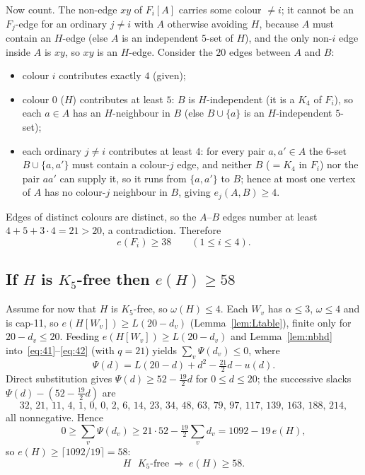 \documentclass[11pt,reqno]{amsart}
\theoremstyle{definition}
\theoremstyle{remark}
\newcommand{\capeleven}{\textsf{cap-11}}
\begin{document}
Now count. The non-edge $xy$ of $F_i[A]$ carries some colour $\ne i$; it cannot be
an $F_j$-edge for an ordinary $j\ne i$ with $A$ otherwise avoiding $H$, because $A$
must contain an $H$-edge (else $A$ is an independent $5$-set of $H$), and the only
non-$i$ edge inside $A$ is $xy$, so $xy$ is an $H$-edge. Consider the $20$ edges
between $A$ and $B$:
\begin{itemize}[nosep]
\item colour $i$ contributes exactly $4$ (given);
\item colour $0$ ($H$) contributes at least $5$: $B$ is $H$-independent (it is a
$K_4$ of $F_i$), so each $a\in A$ has an $H$-neighbour in $B$ (else $B\cup\{a\}$ is
an $H$-independent $5$-set);
\item each ordinary $j\ne i$ contributes at least $4$: for every pair $a,a'\in A$
the $6$-set $B\cup\{a,a'\}$ must contain a colour-$j$ edge, and neither $B$
($=K_4$ in $F_i$) nor the pair $aa'$ can supply it, so it runs from $\{a,a'\}$ to
$B$; hence at most one vertex of $A$ has no colour-$j$ neighbour in $B$, giving
$e_j(A,B)\ge 4$.
\end{itemize}
Edges of distinct colours are distinct, so the $A$--$B$ edges number at least
$4+5+3\cdot 4=21>20$, a contradiction. Therefore
\begin{equation}\label{eq:MH-38}
  e(F_i)\ge 38\qquad(1\le i\le 4).
\end{equation}

\subsection{If $H$ is $K_5$-free then $e(H)\ge 58$}\label{ssec:MH-58}
Assume for now that $H$ is $K_5$-free, so $\omega(H)\le 4$. Each $W_v$ has
$\alpha\le 3$, $\omega\le 4$ and is \capeleven, so $e(H[W_v])\ge L(20-d_v)$
(Lemma~\ref{lem:Ltable}), finite only for $20-d_v\le 20$. Feeding
$e(H[W_v])\ge L(20-d_v)$ and Lemma~\ref{lem:nbhd} into~\eqref{eq:41}--\eqref{eq:42}
(with $q=21$) yields $\sum_v\Psi(d_v)\le 0$, where
\[
  \Psi(d)=L(20-d)+d^2-\tfrac{21}{2}d-u(d).
\]
Direct substitution gives $\Psi(d)\ge 52-\tfrac{19}{2}d$ for $0\le d\le 20$; the
successive slacks $\Psi(d)-(52-\tfrac{19}{2}d)$ are
\[
  32,\,21,\,11,\,4,\,1,\,0,\,0,\,2,\,6,\,14,\,23,\,34,\,48,\,63,\,79,\,97,\,117,\,139,\,163,\,188,\,214,
\]
all nonnegative. Hence
\[
  0\ge\sum_v\Psi(d_v)\ge 21\cdot 52-\tfrac{19}{2}\sum_v d_v=1092-19\,e(H),
\]
so $e(H)\ge\lceil 1092/19\rceil=58$:
\begin{equation}\label{eq:MH-58}
  H\text{ $K_5$-free}\ \Longrightarrow\ e(H)\ge 58 .
\end{equation}
\end{document}

